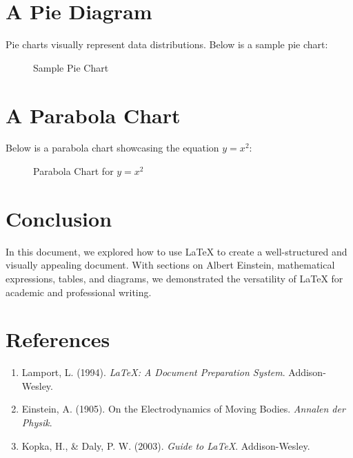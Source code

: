 \documentclass[a4paper]{article} %
\begin{document}
    \section{A Pie Diagram}
    Pie charts visually represent data distributions. Below is a sample pie chart:
    \begin{figure}[h!]
        \centering
        \caption{Sample Pie Chart}
        \label{fig:piechart}
    \end{figure}
    
    \section{A Parabola Chart}
    Below is a parabola chart showcasing the equation $y = x^2$:
    \begin{figure}[h!]
        \centering
        \caption{Parabola Chart for $y = x^2$}
        \label{fig:parabola}
    \end{figure}

    \section{Conclusion}
    In this document, we explored how to use \LaTeX{} to create a well-structured and visually appealing document. 
    With sections on Albert Einstein, mathematical expressions, tables, and diagrams, we demonstrated the versatility of \LaTeX{} for academic and professional writing.

    \section*{References}
    \begin{enumerate}
        \item Lamport, L. (1994). \textit{\LaTeX: A Document Preparation System}. Addison-Wesley.
        \item Einstein, A. (1905). On the Electrodynamics of Moving Bodies. \textit{Annalen der Physik}.
        \item Kopka, H., \& Daly, P. W. (2003). \textit{Guide to \LaTeX}. Addison-Wesley.
    \end{enumerate}
\end{document}
